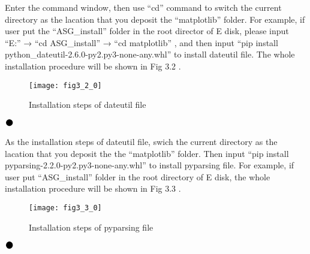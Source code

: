 Enter the command window, then use “cd” command to switch the current directory as the lacation that you deposit the “matplotlib” folder. For example, if user put the “ASG\_install” folder in the root director of E disk, please input “E:” → “cd ASG\_install” → “cd matplotlib” , and then input “pip install python\_dateutil-2.6.0-py2.py3-none-any.whl” to install dateutil file. The whole installation procedure will be shown in Fig 3.2 .
\begin{figure}[ht]
\centering
\texttt{[image: fig3\_2\_0]}
\caption{Installation steps of dateutil file}
\end{figure}

\newpage
\noindent$\vcenter{\hbox{\huge$\bullet$}}$\quad\fontsize{12pt}{\baselineskip}\textbf{}

As the installation steps of dateutil file, swich the current directory as the lacation that you deposit the the “matplotlib” folder. Then input “pip install pyparsing-2.2.0-py2.py3-none-any.whl” to install pyparsing file. For example, if user put “ASG\_install” folder in the root directory of E disk, the whole installation procedure will be shown in Fig 3.3 .


\begin{figure}[H]
\centering
\texttt{[image: fig3\_3\_0]}
\caption{Installation steps of pyparsing file}
\end{figure}

\noindent$\vcenter{\hbox{\huge$\bullet$}}$\quad\fontsize{12pt}{\baselineskip}\textbf{}

